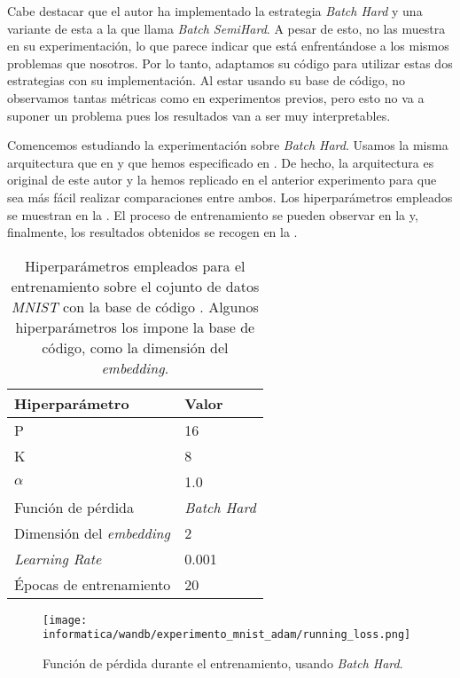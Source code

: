 Cabe destacar que el autor ha implementado la estrategia \textit{Batch Hard} y una variante de esta a la que llama \textit{Batch SemiHard}. A pesar de esto, no las muestra en su experimentación, lo que parece indicar que está enfrentándose a los mismos problemas que nosotros. Por lo tanto, adaptamos su código para utilizar estas dos estrategias con su implementación. Al estar usando su base de código, no observamos tantas métricas como en experimentos previos, pero esto no va a suponer un problema pues los resultados van a ser muy interpretables.

Comencemos estudiando la experimentación sobre \textit{Batch Hard}. Usamos la misma arquitectura que en  y que hemos especificado en . De hecho, la arquitectura es original de este autor y la hemos replicado en el anterior experimento para que sea más fácil realizar comparaciones entre ambos. Los hiperparámetros empleados se muestran en la . El proceso de entrenamiento se pueden observar en la  y, finalmente, los resultados obtenidos se recogen en la .

\begin{table}[!hbtp]
\centering
\begin{tabular}{|l|l|}
    \hline
    Hiperparámetro & Valor \\
    \hline

    P & 16 \\
    K & 8 \\
    $\alpha$ & 1.0 \\
    Función de pérdida & \textit{Batch Hard} \\
    Dimensión del \textit{embedding} & 2 \\
    \textit{Learning Rate} & 0.001 \\
    Épocas de entrenamiento & 20 \\
    \hline
\end{tabular}
    \caption{Hiperparámetros empleados para el entrenamiento sobre el cojunto de datos \textit{MNIST} con la base de código \cite{informatica:adambielski_github}. Algunos hiperparámetros los impone la base de código, como la dimensión del \textit{embedding}.}
    \label{table:hp_adam_mnist}
\end{table}

\begin{figure}[!hbtp]
    \centering
    \texttt{[image: informatica/wandb/experimento\_mnist\_adam/running\_loss.png]}
    \caption{Función de pérdida durante el entrenamiento, usando \textit{Batch Hard}.}
    \label{img:proceso_entrenamiento_adam_mnist}
\end{figure}


